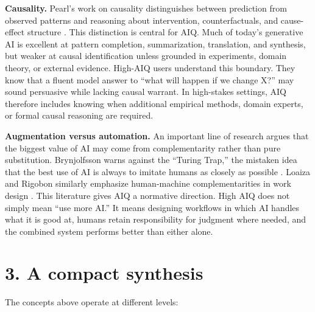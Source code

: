 \documentclass[10pt]{article}
\begin{document}
\textbf{Causality.}
Pearl's work on causality distinguishes between prediction from observed patterns and reasoning about intervention, counterfactuals, and cause-effect structure \cite{pearl2009causality}. This distinction is central for AIQ. Much of today's generative AI is excellent at pattern completion, summarization, translation, and synthesis, but weaker at causal identification unless grounded in experiments, domain theory, or external evidence. High-AIQ users understand this boundary. They know that a fluent model answer to ``what will happen if we change X?'' may sound persuasive while lacking causal warrant. In high-stakes settings, AIQ therefore includes knowing when additional empirical methods, domain experts, or formal causal reasoning are required.

\textbf{Augmentation versus automation.}
An important line of research argues that the biggest value of AI may come from complementarity rather than pure substitution. Brynjolfsson warns against the ``Turing Trap,'' the mistaken idea that the best use of AI is always to imitate humans as closely as possible \cite{brynjolfsson2022turing}. Loaiza and Rigobon similarly emphasize human-machine complementarities in work design \cite{loaiza2024epoch}. This literature gives AIQ a normative direction. High AIQ does not simply mean ``use more AI.'' It means designing workflows in which AI handles what it is good at, humans retain responsibility for judgment where needed, and the combined system performs better than either alone.

\section*{3. A compact synthesis}

The concepts above operate at different levels:
\end{document}
